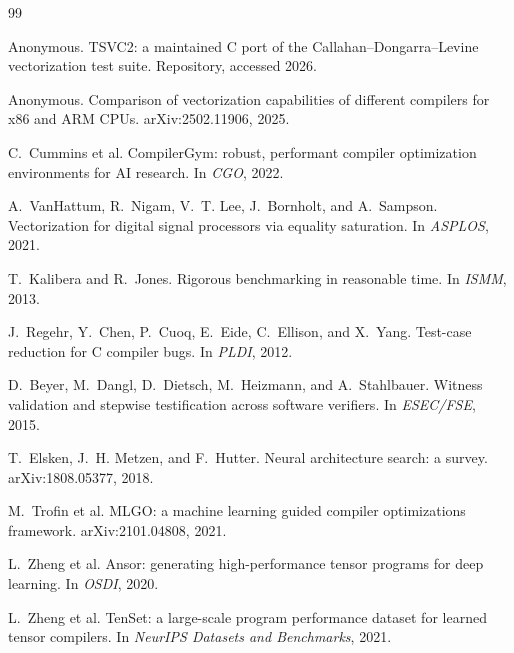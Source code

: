 \documentclass[sigconf,review,anonymous]{acmart}
\begin{document}
\begin{thebibliography}{99}

Anonymous.
TSVC2: a maintained C port of the Callahan--Dongarra--Levine vectorization
test suite. Repository, accessed 2026.

Anonymous.
Comparison of vectorization capabilities of different compilers for x86 and
ARM CPUs.
arXiv:2502.11906, 2025.

C.~Cummins et al.
CompilerGym: robust, performant compiler optimization environments for AI
research.
In \emph{CGO}, 2022.

A.~VanHattum, R.~Nigam, V.~T. Lee, J.~Bornholt, and A.~Sampson.
Vectorization for digital signal processors via equality saturation.
In \emph{ASPLOS}, 2021.

T.~Kalibera and R.~Jones.
Rigorous benchmarking in reasonable time.
In \emph{ISMM}, 2013.

J.~Regehr, Y.~Chen, P.~Cuoq, E.~Eide, C.~Ellison, and X.~Yang.
Test-case reduction for C compiler bugs.
In \emph{PLDI}, 2012.

D.~Beyer, M.~Dangl, D.~Dietsch, M.~Heizmann, and A.~Stahlbauer.
Witness validation and stepwise testification across software verifiers.
In \emph{ESEC/FSE}, 2015.

T.~Elsken, J.~H. Metzen, and F.~Hutter.
Neural architecture search: a survey.
arXiv:1808.05377, 2018.

M.~Trofin et al.
MLGO: a machine learning guided compiler optimizations framework.
arXiv:2101.04808, 2021.

L.~Zheng et al.
Ansor: generating high-performance tensor programs for deep learning.
In \emph{OSDI}, 2020.

L.~Zheng et al.
TenSet: a large-scale program performance dataset for learned tensor
compilers.
In \emph{NeurIPS Datasets and Benchmarks}, 2021.

\end{thebibliography}
\end{document}
